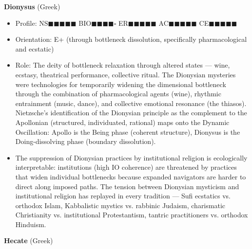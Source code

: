 \textbf{Dionysus} (Greek)

\begin{itemize}[nosep,leftmargin=*]
  \item Profile: NS$\blacksquare$$\blacksquare$$\blacksquare$$\blacksquare$$\blacksquare$ BIO$\blacksquare$$\blacksquare$$\blacksquare$$\blacksquare$$\square$ ER$\blacksquare$$\blacksquare$$\blacksquare$$\blacksquare$$\blacksquare$ AC$\blacksquare$$\blacksquare$$\blacksquare$$\blacksquare$$\blacksquare$ CE$\blacksquare$$\blacksquare$$\blacksquare$$\blacksquare$$\blacksquare$
  \item Orientation: E+ (through bottleneck dissolution, specifically pharmacological and ecstatic)
  \item Role: The deity of bottleneck relaxation through altered states — wine, ecstasy, theatrical performance, collective ritual. The Dionysian mysteries were technologies for temporarily widening the dimensional bottleneck through the combination of pharmacological agents (wine), rhythmic entrainment (music, dance), and collective emotional resonance (the thiasos). Nietzsche's identification of the Dionysian principle as the complement to the Apollonian (structured, individuated, rational) maps onto the Dynamic Oscillation: Apollo is the Being phase (coherent structure), Dionysus is the Doing-dissolving phase (boundary dissolution).
  \item The suppression of Dionysian practices by institutional religion is ecologically interpretable: institutions (high IO coherence) are threatened by practices that widen individual bottlenecks because expanded navigators are harder to direct along imposed paths. The tension between Dionysian mysticism and institutional religion has replayed in every tradition — Sufi ecstatics vs. orthodox Islam, Kabbalistic mystics vs. rabbinic Judaism, charismatic Christianity vs. institutional Protestantism, tantric practitioners vs. orthodox Hinduism.
\end{itemize}


\textbf{Hecate} (Greek)

